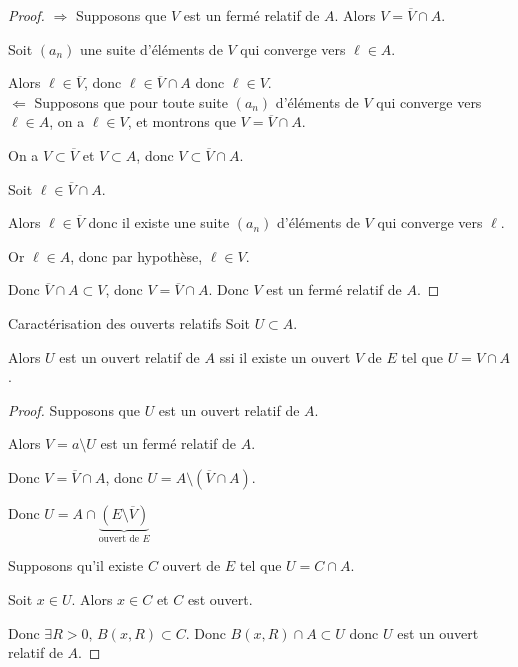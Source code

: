     
\begin{proof}
    $\Rightarrow$ Supposons que $V$ est un fermé relatif de $A$. 
    Alors $V = \overline V \cap A$. 

    Soit $(a_n)$ une suite d'éléments de $V$ qui converge vers $\ell \in A$.

    Alors $\ell \in \overline V$, donc $\ell \in \overline V \cap A$ donc $\ell \in V$. \\

    $\Leftarrow$ Supposons que pour toute suite $(a_n)$ d'éléments de $V$ qui converge vers
    $\ell \in A$, on a $\ell \in V$, et montrons que $V = \overline V \cap A$. 

    On a $V \subset \overline V$ et $V \subset A$, donc $V \subset \overline V \cap A$.

    Soit $\ell \in \overline V \cap A$.

    Alors $\ell \in \overline V$ donc il existe une suite $(a_n)$ d'éléments de $V$ qui converge vers $\ell$.

    Or $\ell \in A$, donc par hypothèse, $\ell \in V$.

    Donc $\overline V \cap A \subset V$, donc $V = \overline V \cap A$.
    Donc $V$ est un fermé relatif de $A$.
\end{proof}

\begin{proposition}{Caractérisation des ouverts relatifs}{}
    Soit $U \subset A$. 

    Alors $U$ est un ouvert relatif de $A$ ssi il existe un ouvert $V$ de $E$ tel que 
    $U = V \cap A$.
\end{proposition}

\begin{proof}
    Supposons que $U$ est un ouvert relatif de $A$.

    Alors $V = a \setminus U$ est un fermé relatif de $A$.

    Donc $V = \overline V \cap A$, donc $U = A \setminus (\overline V \cap A)$. 

    Donc $U = A \cap \underbrace{(E \setminus \overline V)}_{\text{ouvert de } E}$

    \avspace Supposons qu'il existe $C$ ouvert de $E$ tel que $U = C \cap A$.

    Soit $x \in U$. Alors $x \in C$ et $C$ est ouvert.

    Donc $\exists R > 0, \, B(x, R) \subset C$.
    Donc $B(x, R) \cap A \subset U$ donc $U$ est un ouvert relatif de $A$.
\end{proof}

